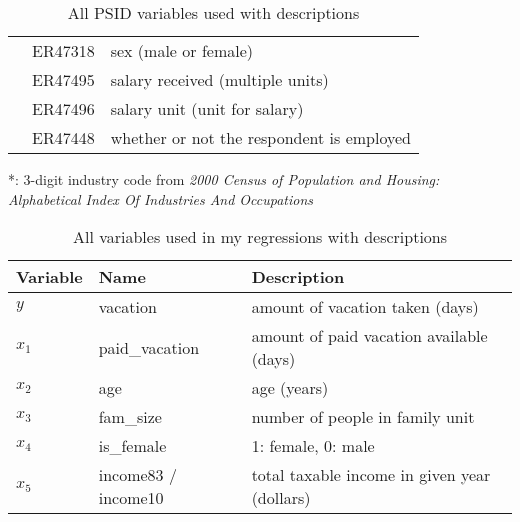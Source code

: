 \documentclass{article}
\begin{document}
\begin{table}[h]
\begin{tabular}{l|l|l}
        & ER47318 & sex (male or female)                        \\ \cline{2-3}
        & ER47495 & salary received (multiple units)            \\ \cline{2-3}
        & ER47496 & salary unit (unit for salary)               \\ \cline{2-3}
        & ER47448 & whether or not the respondent is employed   \\ \hline
    \end{tabular}
    \hspace*{-1.5cm}
    \caption{All PSID variables used with descriptions}
    \label{psid-vars}
      *: 3-digit industry code from
      \textit{2000 Census of Population and Housing:
              Alphabetical Index Of Industries And Occupations}
    \end{table}
    \setlength{\extrarowheight}{3pt}
    \begin{table}[h]
    \centering
    \hspace*{-1.5cm}
    \begin{tabular}{l|l|l}
      Variable & Name                & Description                                  \\ \hline \hline
      $y$      & vacation            & amount of vacation taken (days)              \\ \hline
      $x_1$    & paid\_vacation      & amount of paid vacation available (days)     \\ \hline
      $x_2$    & age                 & age (years)                                  \\ \hline
      $x_3$    & fam\_size           & number of people in family unit              \\ \hline
      $x_4$    & is\_female          & 1: female, 0: male                           \\ \hline
      $x_5$    & income83 / income10 & total taxable income in given year (dollars)
    \end{tabular}
    \hspace*{-1.5cm}
    \caption{All variables used in my regressions with descriptions}
    \end{table}
\end{document}
